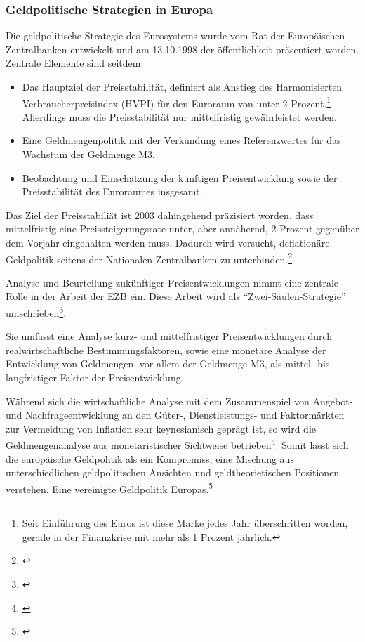 \documentclass[
        onecolumn,
        a4paper,
        abstracton,
        parskip=half
        ,final
        ]{scrartcl}
\begin{document}
\subsubsection{Geldpolitische Strategien in Europa}

Die geldpolitische Strategie des Eurosystems wurde vom Rat der Europ{\"a}ischen Zentralbanken entwickelt und am 13.10.1998 der {\"o}ffentlichkeit pr{\"a}sentiert worden.
Zentrale Elemente sind seitdem:
\begin{itemize}
 \item Das Hauptziel der Preisstabilit{\"a}t, definiert als Anstieg des Harmonisierten Verbraucherpreisindex (HVPI) f{\"u}r den Euroraum von unter 2 Prozent.\footnote[78]{Seit Einf{\"u}hrung des Euros ist diese Marke  jedes Jahr {\"u}berschritten worden, gerade in der Finanzkrise mit mehr als 1 Prozent j{\"a}hrlich.} Allerdings muss die Preisstabilit{\"a}t nur mittelfristig gew{\"a}hrleistet werden.
 \item Eine Geldmengenpolitik mit der Verk{\"u}ndung eines Referenzwertes f{\"u}r das Wachstum der Geldmenge M3.
 \item Beobachtung und Einsch{\"a}tzung der k{\"u}nftigen Preisentwicklung sowie der Preisstabilit{\"a}t des Euroraumes insgesamt.
\end{itemize}

Das Ziel der Preisstabili{\"a}t ist 2003 dahingehend pr{\"a}zisiert worden, dass mittelfristig eine Preissteigerungsrate unter, aber ann{\"a}hernd, 2 Prozent gegen{\"u}ber dem Vorjahr eingehalten werden muss. Dadurch wird versucht, deflation{\"a}re Geldpolitik seitens der Nationalen Zentralbanken zu unterbinden.\footnote[101]{\citep*[vgl.][S.564-568]{Basseler2010}}


Analyse und Beurteilung zuk{\"u}nftiger Preisentwicklungen nimmt eine zentrale Rolle in der Arbeit der EZB ein. Diese Arbeit wird als  "`Zwei-S{\"a}ulen-Strategie"' umschrieben\footnote[95]{\citep*[S.568]{Basseler2010}}.

Sie umfasst eine Analyse kurz- und mittelfristiger Preisentwicklungen durch realwirtschaftliche Bestimmungsfaktoren, sowie eine monet{\"a}re Analyse der Entwicklung von Geldmengen, vor allem der Geldmenge M3, als mittel- bis langfristiger Faktor der Preisentwicklung.

W{\"a}hrend sich die wirtschaftliche Analyse mit dem Zusammenspiel von Angebot- und Nachfrageentwicklung an den G{\"u}ter-, Dienstleistungs- und Faktorm{\"a}rkten zur Vermeidung von Inflation sehr keynesianisch gepr{\"a}gt ist, so wird die Geldmengenanalyse aus monetaristischer Sichtweise betrieben\footnote[97]{\citep*[S.568]{Basseler2010}}. Somit l{\"a}sst sich die europ{\"a}ische Geldpolitik als ein Kompromiss, eine Mischung aus unterschiedlichen geldpolitischen Ansichten und geldtheorietischen Positionen verstehen. Eine vereinigte Geldpolitik Europas.\footnote[99]{\citep*[vgl.][S.558f]{Basseler2010}}
\end{document}
